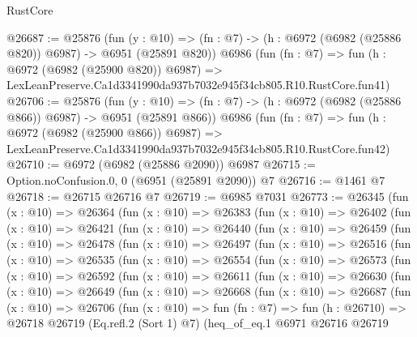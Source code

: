 \begin{lexlean}{RustCore}
\begin{coremodule}
@26687 := @25876
    (fun (y : @10) => (fn : @7) -> (h : @6972 (@6982 (@25886 @820)) @6987) -> @6951 (@25891 @820))
    @6986
    (fun (fn : @7) =>
    fun (h : @6972 (@6982 (@25900 @820)) @6987) =>
    LexLeanPreserve.Ca1d3341990da937b7032e945f34cb805.R10.RustCore.fun41)
@26706 := @25876
    (fun (y : @10) => (fn : @7) -> (h : @6972 (@6982 (@25886 @866)) @6987) -> @6951 (@25891 @866))
    @6986
    (fun (fn : @7) =>
    fun (h : @6972 (@6982 (@25900 @866)) @6987) =>
    LexLeanPreserve.Ca1d3341990da937b7032e945f34cb805.R10.RustCore.fun42)
@26710 := @6972 (@6982 (@25886 @2090)) @6987
@26715 := Option.noConfusion.{0, 0} (@6951 (@25891 @2090)) @7
@26716 := @1461 @7
@26718 := @26715 @26716 @7
@26719 := @6985 @7031
@26773 := @26345
    (fun (x : @10) =>
    @26364
      (fun (x : @10) =>
      @26383
        (fun (x : @10) =>
        @26402
          (fun (x : @10) =>
          @26421
            (fun (x : @10) =>
            @26440
              (fun (x : @10) =>
              @26459
                (fun (x : @10) =>
                @26478
                  (fun (x : @10) =>
                  @26497
                    (fun (x : @10) =>
                    @26516
                      (fun (x : @10) =>
                      @26535
                        (fun (x : @10) =>
                        @26554
                          (fun (x : @10) =>
                          @26573
                            (fun (x : @10) =>
                            @26592
                              (fun (x : @10) =>
                              @26611
                                (fun (x : @10) =>
                                @26630
                                  (fun (x : @10) =>
                                  @26649
                                    (fun (x : @10) =>
                                    @26668
                                      (fun (x : @10) =>
                                      @26687
                                        (fun (x : @10) =>
                                        @26706
                                          (fun (x : @10) =>
                                          fun (fn : @7) =>
                                          fun (h : @26710) =>
                                          @26718
                                            @26719
                                            (Eq.refl.{2} (Sort 1) @7)
                                            (heq_of_eq.{1}
                                              @6971
                                              @26716
                                              @26719

\end{coremodule}
\end{lexlean}
